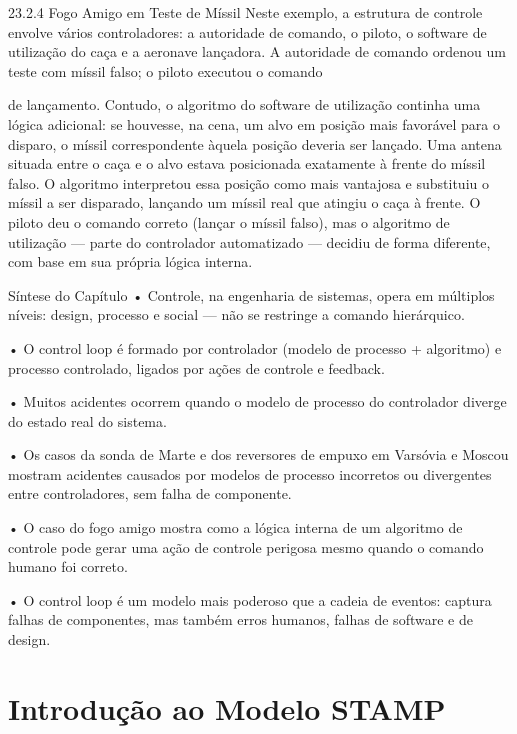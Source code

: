 23.2.4 Fogo Amigo em Teste de Míssil Neste exemplo, a estrutura de controle envolve vários controladores: a autoridade de comando, o piloto, o software de utilização do caça e a aeronave lançadora. A autoridade de comando ordenou um teste com míssil falso; o piloto executou o comando

de lançamento. Contudo, o algoritmo do software de utilização continha uma lógica adicional: se houvesse, na cena, um alvo em posição mais favorável para o disparo, o míssil correspondente àquela posição deveria ser lançado. Uma antena situada entre o caça e o alvo estava posicionada exatamente à frente do míssil falso. O algoritmo interpretou essa posição como mais vantajosa e substituiu o míssil a ser disparado, lançando um míssil real que atingiu o caça à frente. O piloto deu o comando correto (lançar o míssil falso), mas o algoritmo de utilização — parte do controlador automatizado — decidiu de forma diferente, com base em sua própria lógica interna.

Síntese do Capítulo • Controle, na engenharia de sistemas, opera em múltiplos níveis: design, processo e social — não se restringe a comando hierárquico.

• O control loop é formado por controlador (modelo de processo + algoritmo) e processo controlado, ligados por ações de controle e feedback.

• Muitos acidentes ocorrem quando o modelo de processo do controlador diverge do estado real do sistema.

• Os casos da sonda de Marte e dos reversores de empuxo em Varsóvia e Moscou mostram acidentes causados por modelos de processo incorretos ou divergentes entre controladores, sem falha de componente.

• O caso do fogo amigo mostra como a lógica interna de um algoritmo de controle pode gerar uma ação de controle perigosa mesmo quando o comando humano foi correto.

• O control loop é um modelo mais poderoso que a cadeia de eventos: captura falhas de componentes, mas também erros humanos, falhas de software e de design.

\chapter{Introdução ao Modelo STAMP}

